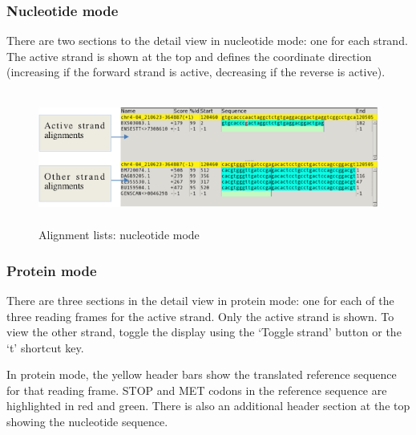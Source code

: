 \documentclass[letterpaper]{article}
\begin{document}
\bigskip

{\color[rgb]{0.30980393,0.5058824,0.7411765}\subsubsection[Nucleotide mode]{Nucleotide mode}}
\hypertarget{RefHeading1721056909880}{}{
There are two sections to the detail view in nucleotide mode: one for
each strand. The active strand is shown at the top and defines the
coordinate direction (increasing if the forward strand is active,
decreasing if the reverse is active).}

\begin{figure}
\centering
\color[rgb]{0.30980393,0.5058824,0.7411765}
\includegraphics[width=14.933cm,height=4.353cm]{img_view_alignment_details_nucleotide.png}
\caption{Alignment lists: nucleotide mode}
\end{figure}

\bigskip

{\color[rgb]{0.30980393,0.5058824,0.7411765}\subsubsection[Protein mode]{Protein mode}}
\hypertarget{RefHeading1741056909880}{}{
There are three sections in the detail view in protein mode: one for
each of the three reading frames for the active strand. Only the
active strand is shown. To view the other strand, toggle the display
using the {\textquoteleft}Toggle strand{\textquoteright} button or the
{\textquoteleft}t{\textquoteright} shortcut key.}

\bigskip

{In protein mode, the yellow header bars show the translated reference
sequence for that reading frame. STOP and MET codons in the reference
sequence are highlighted in red and green. There is also an
additional header section at the top showing the nucleotide sequence.}
\end{document}
